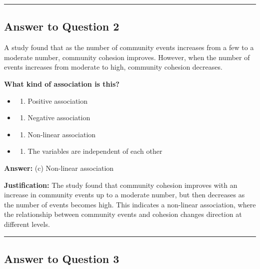 \documentclass[
  11pt,
]{article}
\providecommand{\tightlist}{%
  \setlength{\itemsep}{0pt}\setlength{\parskip}{0pt}}
\begin{document}
\hrule

\subsection{Answer to Question 2}\label{answer-to-question-2}

A study found that as the number of community events increases from a
few to a moderate number, community cohesion improves. However, when the
number of events increases from moderate to high, community cohesion
decreases.

\textbf{What kind of association is this?}

\begin{itemize}
\tightlist
\item
  \begin{enumerate}
  \def\labelenumi{(\alph{enumi})}
  \tightlist
  \item
    Positive association
  \end{enumerate}
\item
  \begin{enumerate}
  \def\labelenumi{(\alph{enumi})}
  \setcounter{enumi}{1}
  \tightlist
  \item
    Negative association
  \end{enumerate}
\item
  \begin{enumerate}
  \def\labelenumi{(\alph{enumi})}
  \setcounter{enumi}{2}
  \tightlist
  \item
    Non-linear association
  \end{enumerate}
\item
  \begin{enumerate}
  \def\labelenumi{(\alph{enumi})}
  \setcounter{enumi}{3}
  \tightlist
  \item
    The variables are independent of each other
  \end{enumerate}
\end{itemize}

\textbf{Answer:} (c) Non-linear association

\textbf{Justification:} The study found that community cohesion improves
with an increase in community events up to a moderate number, but then
decreases as the number of events becomes high. This indicates a
non-linear association, where the relationship between community events
and cohesion changes direction at different levels.

\hrule

\subsection{Answer to Question 3}\label{answer-to-question-3}
\end{document}
